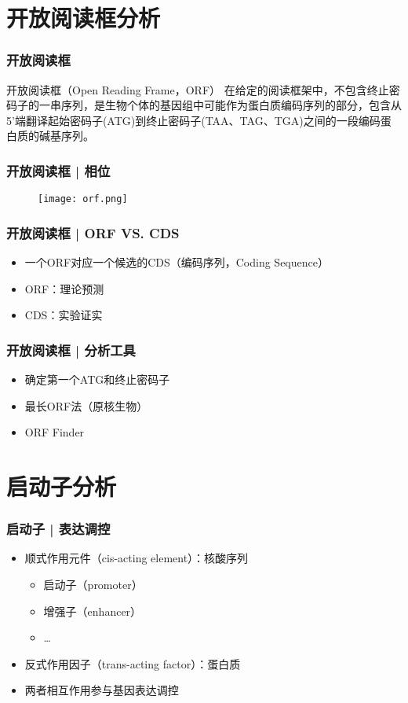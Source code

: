 \section{开放阅读框分析}
\begin{frame}
	\frametitle{开放阅读框}
	\begin{block}{开放阅读框（Open Reading Frame，ORF）}
		在给定的阅读框架中，不包含终止密码子的一串序列，是生物个体的基因组中可能作为蛋白质编码序列的部分，包含从5'端翻译起始密码子(ATG)到终止密码子(TAA、TAG、TGA)之间的一段编码蛋白质的碱基序列。
	\end{block}
\end{frame}

\begin{frame}
	\frametitle{开放阅读框 | 相位}
	\begin{figure}
		\centering
		\texttt{[image: orf.png]}
	\end{figure}
\end{frame}

\begin{frame}
	\frametitle{开放阅读框 | ORF VS. CDS}
	\pause
	\begin{itemize}
		\item 一个ORF对应一个候选的CDS（编码序列，Coding Sequence）
		\item ORF：理论预测
		\item CDS：实验证实
	\end{itemize}
\end{frame}

\begin{frame}
	\frametitle{开放阅读框 | 分析工具}
	\begin{itemize}
		\item 确定第一个ATG和终止密码子
		\item 最长ORF法（原核生物）
		\item ORF Finder
	\end{itemize}
\end{frame}

\section{启动子分析}
\begin{frame}
	\frametitle{启动子 | 表达调控}
	\begin{itemize}
		\item 顺式作用元件（cis-acting element）：核酸序列
			\begin{itemize}
				\item 启动子（promoter）
				\item 增强子（enhancer）
				\item \ldots
			\end{itemize}
		\item 反式作用因子（trans-acting factor）：蛋白质
		\item 两者相互作用参与基因表达调控
	\end{itemize}
\end{frame}

